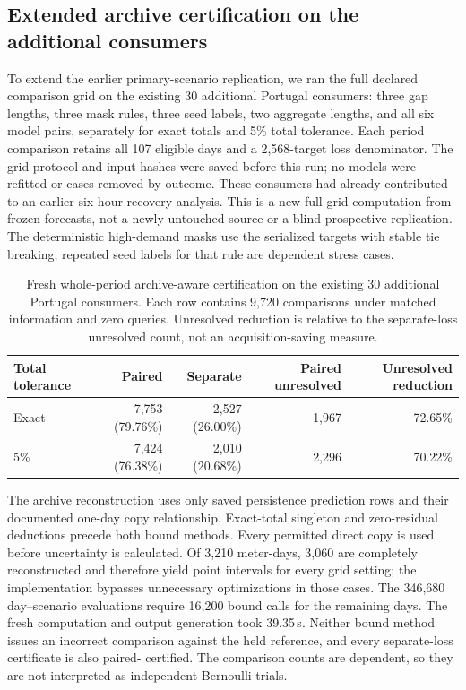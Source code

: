 \subsection{Extended archive certification on the additional consumers}
\label{sec:extended_archive_replication}
To extend the earlier primary-scenario replication, we ran the full declared
comparison grid on the existing 30 additional Portugal consumers: three gap
lengths, three mask rules, three seed labels, two aggregate lengths, and all
six model pairs, separately for exact totals and 5\% total tolerance.
Each period comparison retains all 107 eligible days and a 2,568-target loss
denominator. The grid protocol and input hashes were saved before this run;
no models were refitted or cases removed by outcome. These consumers had
already contributed to an earlier six-hour recovery analysis. This is a new
full-grid computation from frozen forecasts, not a newly untouched source
or a blind prospective replication. The deterministic high-demand masks use
the serialized targets with stable tie breaking; repeated seed labels for
that rule are dependent stress cases.

\begin{table}[t]
\centering
\caption{Fresh whole-period archive-aware certification on the existing
30 additional Portugal consumers. Each row contains 9,720 comparisons under
matched information and zero queries. Unresolved reduction is relative to
the separate-loss unresolved count, not an acquisition-saving measure.}
\label{tab:extended_archive_replication}
\small\setlength{\tabcolsep}{4pt}
\begin{tabular}{lrrrr}
\toprule
Total tolerance & Paired & Separate & Paired unresolved & Unresolved reduction\\
\midrule
Exact & 7,753 (79.76\%) & 2,527 (26.00\%) & 1,967 & 72.65\%\\
5\% & 7,424 (76.38\%) & 2,010 (20.68\%) & 2,296 & 70.22\%\\
\bottomrule
\end{tabular}
\end{table}

The archive reconstruction uses only saved persistence prediction rows and
their documented one-day copy relationship. Exact-total singleton and
zero-residual deductions precede both bound methods. Every permitted direct
copy is used before uncertainty is calculated. Of 3,210 meter-days, 3,060
are completely reconstructed and therefore yield point intervals for every
grid setting; the implementation bypasses unnecessary optimizations in
those cases. The 346,680 day--scenario evaluations require 16,200 bound
calls for the remaining days. The fresh computation and output generation
took 39.35\,s. Neither bound method issues an incorrect comparison against
the held reference, and every separate-loss certificate is also paired-
certified. The comparison counts are dependent, so they are not interpreted
as independent Bernoulli trials.

